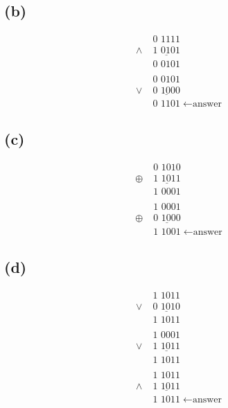 \documentclass{article}
\begin{document}
\subsection{(b)}
\begin{align*}
	&\text{0 1111} \\
	\land \; &\underline{\text{1 0101}} \\
	&\text{0 0101} \\
	& \\
	&\text{0 0101} \\
	\lor \; &\underline{\text{0 1000}} \\
	&\text{0 1101} \; \leftarrow \text{answer}
\end{align*}

\subsection{(c)}
\begin{align*}
	&\text{0 1010} \\
	\oplus \; &\underline{\text{1 1011}} \\
	&\text{1 0001} \\
	& \\
	&\text{1 0001} \\
	\oplus \; &\underline{\text{0 1000}} \\
	&\text{1 1001} \; \leftarrow \text{answer}
\end{align*}

\subsection{(d)}
\begin{align*}
	&\text{1 1011} \\
	\lor \; &\underline{\text{0 1010}} \\
	&\text{1 1011} \\
	& \\
	&\text{1 0001} \\
	\lor \; &\underline{\text{1 1011}} \\
	&\text{1 1011} \\
	& \\
	&\text{1 1011} \\
	\land \; &\underline{\text{1 1011}} \\
	&\text{1 1011} \; \leftarrow \text{answer}
\end{align*}


	
\end{document}
